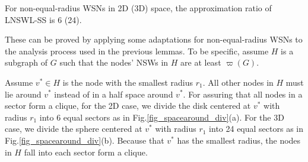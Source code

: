 \documentclass[journal,10pt]{IEEEtran}
\begin{document}
\begin{lemma}
\label{lemma_2d3d_ratio}
For non-equal-radius WSNs in 2D (3D) space, the approximation ratio of LNSWL-SS is 6 (24).
\end{lemma}

\begin{IEEEproof}
These can be proved by applying some adaptations for non-equal-radius WSNs to the analysis process used in the previous lemmas. To be specific, assume $H$ is a subgraph of $G$ such that the nodes' NSWs in $H$ are at least $\varpi(G)$.

Assume $v^{*}{\in}H$ is the node with the smallest radius $r_1$. All other nodes in $H$ must lie around $v^{*}$ instead of in a half space around $v^{*}$. For assuring that all nodes in a sector form a clique, for the 2D case, we divide the disk centered at $v^{*}$ with radius $r_1$ into 6 equal sectors as in Fig.\ref{fig_spacearound_div}(a). For the 3D case, we divide the sphere centered at $v^{*}$ with radius $r_1$ into 24 equal sectors as in Fig.\ref{fig_spacearound_div}(b). Because that $v^{*}$ has the smallest radius, the nodes in $H$ fall into each sector form a clique.


\end{IEEEproof}
\end{document}

